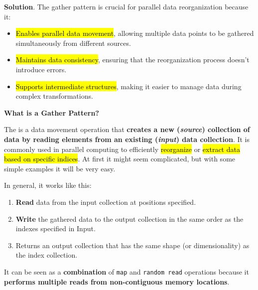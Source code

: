 \begin{enumerate}
    \textcolor{Green3}{ \textbf{Solution}}. The gather pattern is crucial for parallel data reorganization because it:
    \begin{itemize}[label=\textcolor{Green3}{}]
        \item \hl{Enables parallel data movement}, allowing multiple data points to be gathered simultaneously from different sources.
        \item \hl{Maintains data consistency}, ensuring that the reorganization process doesn't introduce errors.
        \item \hl{Supports intermediate structures}, making it easier to manage data during complex transformations.
    \end{itemize}
\end{enumerate}

\newpage

\begin{flushleft}
    \textcolor{Green3}{ \textbf{What is a Gather Pattern?}}
\end{flushleft}
The  is a data movement operation that \textbf{creates a new (\emph{source}) collection of data by reading elements from an existing (\emph{input}) data collection}. It is commonly used in parallel computing to efficiently \hl{reorganize} or \hl{extract data based on specific indices}. At first it might seem complicated, but with some simple examples it will be very easy.

\highspace
In general, it works like this:
\begin{enumerate}
    \item \textbf{Read} data from the input collection at positions specified.
    \item \textbf{Write} the gathered data to the output collection in the same order as the indexes specified in Input.
    \item Returns an output collection that has the same shape (or dimensionality) as the index collection.
\end{enumerate}
It can be seen as a \textbf{combination} of \texttt{map} and \texttt{random read} operations because it \textbf{performs multiple reads from non-contiguous memory locations}.

